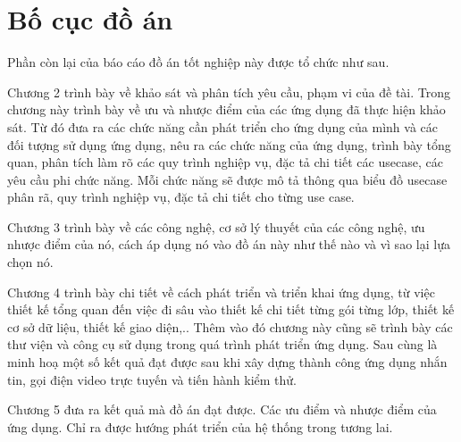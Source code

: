 \documentclass[../DoAn.tex]{subfiles}
\begin{document}
\section{Bố cục đồ án}
\label{section:1.4}
Phần còn lại của báo cáo đồ án tốt nghiệp này được tổ chức như sau. 

Chương 2 trình bày về khảo sát và phân tích yêu cầu, phạm vi của đề tài. Trong chương này trình bày về ưu và nhược điểm của các ứng dụng đã thực hiện khảo sát. Từ đó đưa ra các chức năng cần phát triển cho ứng dụng của mình và các đối tượng sử dụng ứng dụng, nêu ra các chức năng của ứng dụng, trình bày tổng quan, phân tích làm rõ các quy trình nghiệp vụ, đặc tả chi tiết các usecase, các yêu cầu phi chức năng. Mỗi chức năng sẽ được mô tả thông qua biểu đồ usecase phân rã, quy trình nghiệp vụ, đặc tả chi tiết cho từng use case. 

Chương 3 trình bày về các công nghệ, cơ sở lý thuyết của các công nghệ, ưu nhược điểm của nó, cách áp dụng nó vào đồ án này như thế nào và vì sao lại lựa chọn nó. 

Chương 4 trình bày chi tiết về cách phát triển và triển khai ứng dụng, từ việc thiết kế tổng quan đến việc đi sâu vào thiết kế chi tiết từng gói từng lớp, thiết kế cơ sở dữ liệu, thiết kế giao diện,.. Thêm vào đó chương này cũng sẽ trình bày các thư viện và công cụ sử dụng trong quá trình phát triển ứng dụng. Sau cùng là minh hoạ một số kết quả đạt được sau khi xây dựng thành công ứng dụng nhắn tin, gọi điện video trực tuyến và tiến hành kiểm thử.

Chương 5 đưa ra kết quả mà đồ án đạt được. Các ưu điểm và nhược điểm của ứng dụng. Chỉ ra được hướng phát triển của hệ thống trong tương lai.




\end{document}
